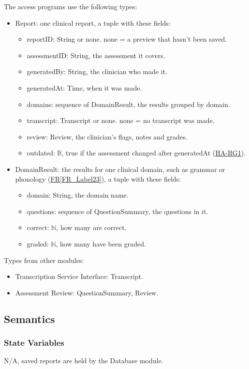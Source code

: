 \documentclass[12pt, titlepage]{article}
\newcommand{\srsref}[2]{\href{https://github.com/Nour-Fawaz/MacaBoca/blob/main/pdfs/SRS/SRS.pdf}{#1\ref*{#2}}}
\newcommand{\hazref}[1]{\href{https://github.com/Nour-Fawaz/MacaBoca/blob/main/pdfs/HazardAnalysis/HazardAnalysis.pdf}{#1}}
\begin{document}
\noindent The access programs use the following types:
\begin{itemize}
\item Report: one clinical report, a tuple with these fields:
  \begin{itemize}
  \item reportID: String or none. none = a preview that hasn't been saved.
  \item assessmentID: String, the assessment it covers.
  \item generatedBy: String, the clinician who made it.
  \item generatedAt: Time, when it was made.
  \item domains: sequence of DomainResult, the results grouped by domain.
  \item transcript: Transcript or none. none = no transcript was made.
  \item review: Review, the clinician's flags, notes and grades.
  \item outdated: $\mathbb{B}$, true if the assessment changed after generatedAt (\hazref{HA-RG1}).
  \end{itemize}
\item DomainResult: the results for one clinical domain, such as grammar or phonology (\srsref{FR}{FR_Label23}), a tuple with these fields:
  \begin{itemize}
  \item domain: String, the domain name.
  \item questions: sequence of QuestionSummary, the questions in it.
  \item correct: $\mathbb{N}$, how many are correct.
  \item graded: $\mathbb{N}$, how many have been graded.
  \end{itemize}
\end{itemize}
Types from other modules:
\begin{itemize}
\item Transcription Service Interface: Transcript.
\item Assessment Review: QuestionSummary, Review.
\end{itemize}

\subsection{Semantics}

\subsubsection{State Variables}
N/A, saved reports are held by the Database module.
\end{document}
